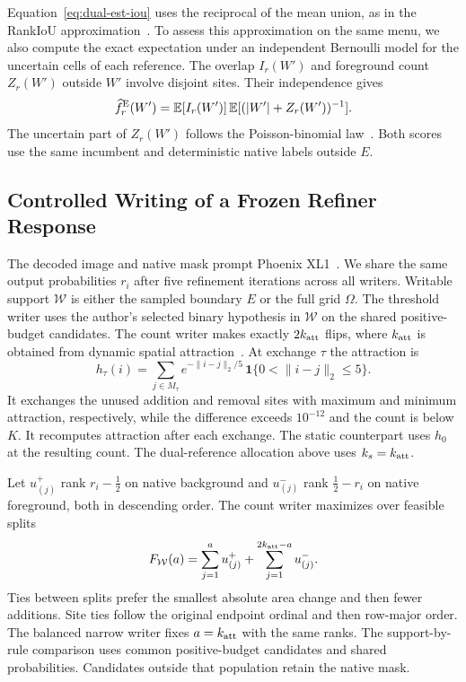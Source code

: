 Equation~\eqref{eq:dual-est-iou} uses the reciprocal of the mean union, as in the RankIoU approximation~\cite{rankrma}. To assess this approximation on the same menu, we also compute the exact expectation under an independent Bernoulli model for the uncertain cells of each reference. The overlap \(I_r(W')\) and foreground count \(Z_r(W')\) outside \(W'\) involve disjoint sites. Their independence gives
\begin{equation}
\widehat f^{\rm E}_r(W')=\mathbb E[I_r(W')]\,
             \mathbb E[(|W'|+Z_r(W'))^{-1}] .
\label{eq:exact-iou-signed}
\end{equation}
The uncertain part of \(Z_r(W')\) follows the Poisson-binomial law~\cite{rankseg}. Both scores use the same incumbent and deterministic native labels outside \(E\).

\subsection{Controlled Writing of a Frozen Refiner Response}
\label{sec:phoenix}
The decoded image and native mask prompt Phoenix XL1~\cite{phoenix}. We share the same output probabilities \(r_i\) after five refinement iterations across all writers. Writable support \(\mathcal W\) is either the sampled boundary \(E\) or the full grid \(\Omega\). The threshold writer uses the author's selected binary hypothesis in \(\mathcal W\) on the shared positive-budget candidates. The count writer makes exactly \(2k_{\rm att}\) flips, where \(k_{\rm att}\) is obtained from dynamic spatial attraction~\cite{atkinson}. At exchange \(\tau\) the attraction is
\begin{equation}
h_\tau(i)=\sum_{j\in M_\tau}
 e^{-\|i-j\|_2/5}\,\mathbf 1\{0<\|i-j\|_2\le5\}.
\label{eq:dynamic-attraction}
\end{equation}
It exchanges the unused addition and removal sites with maximum and minimum attraction, respectively, while the difference exceeds \(10^{-12}\) and the count is below \(K\). It recomputes attraction after each exchange. The static counterpart uses \(h_0\) at the resulting count. The dual-reference allocation above uses \(k_s=k_{\rm att}\).

Let \(u_{(j)}^+\) rank \(r_i-\tfrac12\) on native background and \(u_{(j)}^-\) rank \(\tfrac12-r_i\) on native foreground, both in descending order. The count writer maximizes over feasible splits
\begin{equation}
F_{\mathcal W}(a)=\sum_{j=1}^{a}u_{(j)}^+
          +\sum_{j=1}^{2k_{\rm att}-a}u_{(j)}^- .
\label{eq:writer-quota}
\end{equation}
Ties between splits prefer the smallest absolute area change and then fewer additions. Site ties follow the original endpoint ordinal and then row-major order. The balanced narrow writer fixes \(a=k_{\rm att}\) with the same ranks. The support-by-rule comparison uses common positive-budget candidates and shared probabilities. Candidates outside that population retain the native mask.

